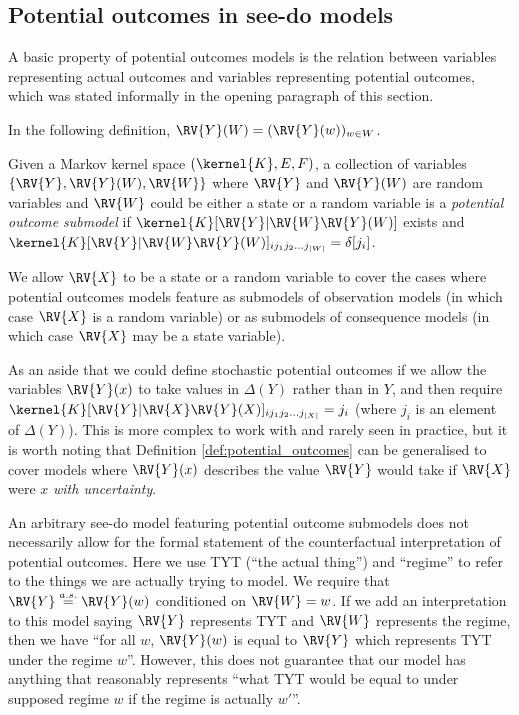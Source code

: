 \subsection{Potential outcomes in see-do models}

A basic property of potential outcomes models is the relation between variables representing actual outcomes and variables representing potential outcomes, which was stated informally in the opening paragraph of this section.

In the following definition, $\RV{Y}(W)=(\RV{Y}(w))_{w\in W}$.

\begin{definition}\label{def:potential_outcomes}
Given a Markov kernel space $(\kernel{K},E,F)$, a collection of variables $\{\RV{Y}, \RV{Y}(W), \RV{W}\}$ where $\RV{Y}$ and $\RV{Y}(W)$ are random variables and $\RV{W}$ could be either a state or a random variable is a \emph{potential outcome submodel} if $\kernel{K}[\RV{Y}|\RV{W}\RV{Y}(W)]$ exists and $\kernel{K}[\RV{Y}|\RV{W}\RV{Y}(W)]_{i j_1 j_2 ... j_{|W|}} = \delta[j_i]$. 
\end{definition}


We allow $\RV{X}$ to be a state or a random variable to cover the cases where potential outcomes models feature as submodels of observation models (in which case $\RV{X}$ is a random variable) or as submodels of consequence models (in which case $\RV{X}$ may be a state variable).

As an aside that we could define stochastic potential outcomes if we allow the variables $\RV{Y}(x)$ to take values in $\Delta(Y)$ rather than in $Y$, and then require $\kernel{K}[\RV{Y}|\RV{X}\RV{Y}(X)]_{i j_1 j_2 ... j_{|X|}} = j_i$ (where $j_i$ is an element of $\Delta(Y)$). This is more complex to work with and rarely seen in practice, but it is worth noting that Definition \ref{def:potential_outcomes} can be generalised to cover models where $\RV{Y}(x)$ describes the value $\RV{Y}$ would take if $\RV{X}$ were $x$ \emph{with uncertainty}.

An arbitrary see-do model featuring potential outcome submodels does not necessarily allow for the formal statement of the counterfactual interpretation of potential outcomes. Here we use TYT (``the actual thing'') and ``regime'' to refer to the things we are actually trying to model. We require that $\RV{Y}\overset{a.s.}{=}\RV{Y}(w)$ conditioned on $\RV{W}=w$. If we add an interpretation to this model saying $\RV{Y}$ represents TYT and $\RV{W}$ represents the regime, then we have ``for all $w$, $\RV{Y}(w)$ is equal to $\RV{Y}$ which represents TYT under the regime $w$''. However, this does not guarantee that our model has anything that reasonably represents ``what TYT would be equal to under supposed regime $w$ if the regime is actually $w'$''.

